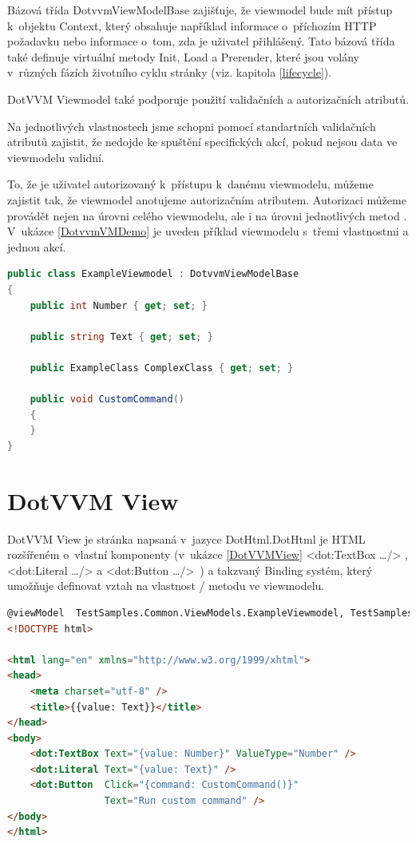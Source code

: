 Bázová třída DotvvmViewModelBase zajišťuje, že viewmodel bude mít přístup k~objektu Context, který obsahuje například informace o~příchozím HTTP požadavku nebo informace o~tom, zda je uživatel přihlášený.
Tato bázová třída také definuje virtuální metody Init, Load a Prerender, které jsou volány v~různých fázích životního cyklu stránky (viz. kapitola \ref{lifecycle}).

DotVVM Viewmodel také podporuje použití validačních a autorizačních atributů.

Na jednotlivých vlastnostech jsme schopni pomocí standartních validačních atributů zajistit, že nedojde ke spuštění specifických akcí, pokud nejsou data ve viewmodelu validní\cite{DotVVM-Validation}. 

To, že je uživatel autorizovaný k~přístupu k~danému viewmodelu, můžeme zajistit tak, že viewmodel anotujeme autorizačním atributem. Autorizaci můžeme provádět nejen na úrovni celého viewmodelu, ale i na úrovni jednotlivých metod \cite{DotvvmAuth}. V~ukázce \ref{DotvvmVMDemo} je uveden příklad viewmodelu s~třemi vlastnostmi a jednou akcí.

\begin{lstlisting}[language=c#, caption=Ukázka DotVVM Viewmodelu,label=DotvvmVMDemo,captionpos=t]
public class ExampleViewmodel : DotvvmViewModelBase
{
    public int Number { get; set; }

    public string Text { get; set; }

    public ExampleClass ComplexClass { get; set; }

    public void CustomCommand() 
    {
    }
}
\end{lstlisting}


\section{DotVVM View}
DotVVM View je stránka napsaná v~jazyce DotHtml.DotHtml je HTML rozšířeném o~vlastní komponenty (v~ukázce \ref{DotVVMView} <dot:TextBox \ldots /> , <dot:Literal \ldots /> a <dot:Button \ldots />~) a takzvaný Binding systém, který umožňuje definovat vztah na vlastnost / metodu ve viewmodelu.

\begin{lstlisting}[language=html, caption=Ukázka DotHtml,captionpos=t,label=DotVVMView]
@viewModel  TestSamples.Common.ViewModels.ExampleViewmodel, TestSamples.Common
<!DOCTYPE html>

<html lang="en" xmlns="http://www.w3.org/1999/xhtml">
<head>
    <meta charset="utf-8" />
    <title>{{value: Text}}</title>
</head>
<body>
    <dot:TextBox Text="{value: Number}" ValueType="Number" />
    <dot:Literal Text="{value: Text}" />
    <dot:Button  Click="{command: CustomCommand()}"
                 Text="Run custom command" />
</body>
</html>
\end{lstlisting}

